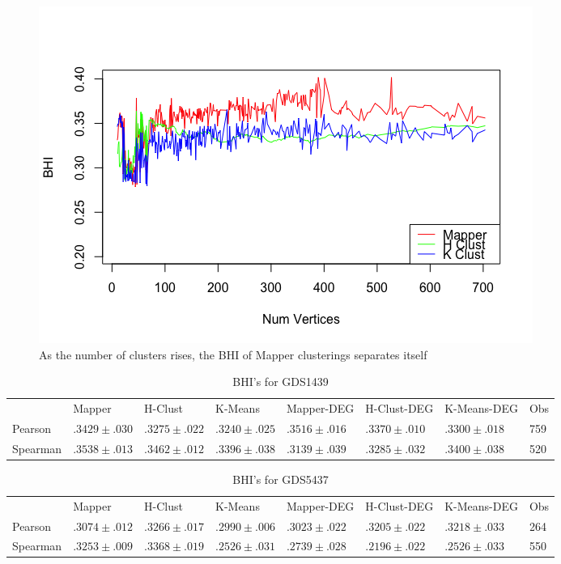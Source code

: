 \documentclass[preprint,10pt]{elsarticle}
\begin{document}
	
\begin{figure}
  \includegraphics[width=\linewidth]{plotTrend}
  \caption{As the number of clusters rises, the BHI of Mapper clusterings separates itself}
  \label{bhi-trend}
\end{figure}

	
\begin{table}[]
\centering
\caption{BHI's for GDS1439}
\label{table-bhi-1439}
\begin{tabular}{llllllll}
         & Mapper            & H-Clust           & K-Means           & Mapper-DEG        &  H-Clust-DEG        & K-Means-DEG       & Obs \\
Pearson  & $.3429 \pm .030$ & $.3275 \pm .022$ & $.3240 \pm .025$ & $ .3516 \pm .016$ & $ .3370 \pm .010 $ & $ .3300 \pm .018 $ & 759 \\
Spearman & $.3538 \pm.013$  & $.3462 \pm .012$  & $.3396 \pm .038$ & $ .3139 \pm .039$ & $ .3285 \pm .032$  & $ .3400 \pm .038 $ & 520
\end{tabular}
\end{table}

\begin{table}[]
\centering
\caption{BHI's for GDS5437}
\label{table-bhi-5437}
\begin{tabular}{llllllll}
         & Mapper            & H-Clust           & K-Means           & Mapper-DEG        & H-Clust-DEG       & K-Means-DEG       & Obs \\
Pearson  & $.3074  \pm .012$ & $.3266 \pm .017 $ & $ .2990 \pm .006$ & $ .3023 \pm .022$ & $ .3205 \pm .022$ & $ .3218 \pm .033$ & 264 \\
Spearman & $.3253 \pm .009$  & $ .3368 \pm.019 $  & $.2526 \pm .031$  & $ .2739 \pm .028$ & $ .2196 \pm .022$ & $ .2526 \pm .033$ & 550
\end{tabular}
\end{table}
	
\end{document}

